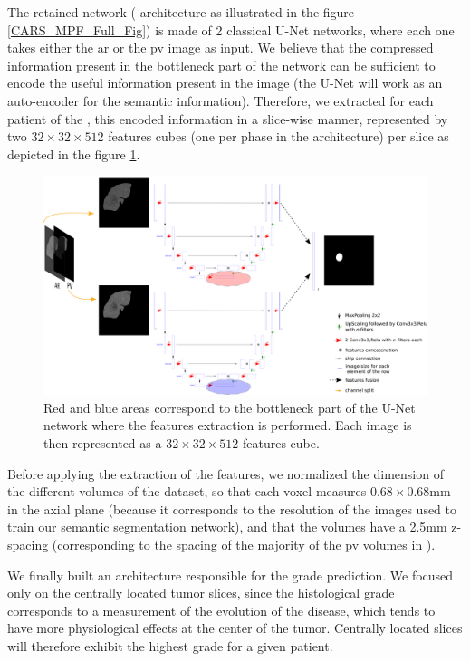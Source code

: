The retained network ( architecture as illustrated in the figure \ref{CARS_MPF_Full_Fig}) is made of 2 classical U-Net networks, where each
one takes either the \ac{ar} or the \ac{pv} image as input. We believe
that the compressed information present in the bottleneck part of the
network can be sufficient to encode the useful information present in the
image (the U-Net will work as an auto-encoder for the semantic information). Therefore, we extracted for each patient of the \textbf{}, this
encoded information in a slice-wise manner, represented by two $ 32\times32\times512 $
features cubes (one per phase in the  architecture) per slice
as depicted in the figure \ref{fig:MPF_Features_Selection}.


\begin{figure}[th!]
\centering
\includegraphics[width=0.95\linewidth]{../HistologicalGradePrediction/images/MPF_Features_Selection}
\caption{Red and blue areas correspond to the bottleneck part of the U-Net
network where the features extraction is performed. Each image is then
represented as a $ 32\times32\times512 $ features cube.}
\label{fig:MPF_Features_Selection}
\end{figure}


Before applying the extraction of the features, we normalized
the dimension of the different volumes of the dataset, so that each
voxel measures $ 0.68\times0.68 $mm in the axial plane (because it corresponds to
the resolution of the images used to train our semantic segmentation
network), and that the volumes have a 2.5mm z-spacing (corresponding to the
spacing of the majority of the \ac{pv} volumes in \textbf{}).

We finally built an architecture responsible for the grade prediction.
We focused only on the centrally located tumor slices, since the
histological grade corresponds to a measurement of the evolution of the
disease, which tends to have more physiological effects at the center of
the tumor. Centrally located slices will therefore exhibit the highest
grade for a given patient.


